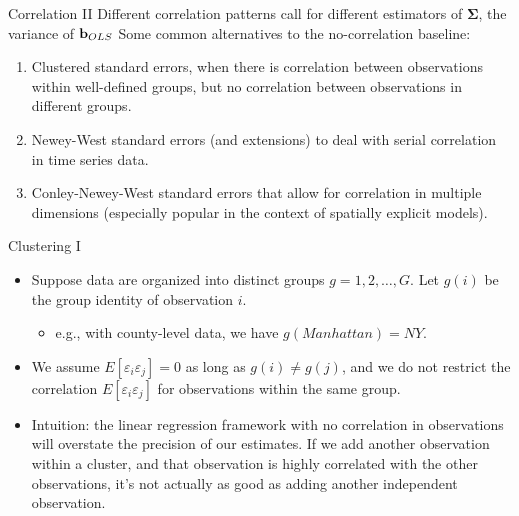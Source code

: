 \begin{frame}{Correlation II}
 Different correlation patterns call for different estimators of $\boldsymbol{\Sigma}$, the variance of ${\bf b}_{OLS}$
	Some common alternatives to the no-correlation baseline:
\begin{enumerate}
	\item Clustered standard errors, when there is correlation between observations
	within well-defined groups, but no correlation between observations in different groups. 
	\item Newey-West standard errors (and extensions) to deal with serial correlation
	in time series data.
	\item Conley-Newey-West standard errors that allow for correlation in multiple dimensions
	(especially popular in the context of spatially explicit models).
\end{enumerate}
\end{frame}


\begin{frame}{Clustering I}
\begin{itemize}
	\item Suppose data are organized into distinct groups $g=1,2,\dots,G$. Let $g\left(i\right)$
	be the group identity of observation $i$. 
	\begin{itemize}
		\item e.g., with county-level data, we have $g\left(Manhattan\right)=NY$.
	\end{itemize}


	\medskip
	\item We assume $E\left[\varepsilon_i \varepsilon_j\right]=0$ as long as $g\left(i\right)\ne g\left(j\right)$,
	and we do not restrict the correlation $E\left[\varepsilon_i \varepsilon_j\right]$
	for observations within the same group.

	\medskip
	\item Intuition: the linear regression framework with no correlation in observations will overstate
	the precision of our estimates. If we add another observation within a cluster, and that observation
	is highly correlated with the other observations, it's not actually as good as adding another independent observation. 
\end{itemize}
\end{frame}

